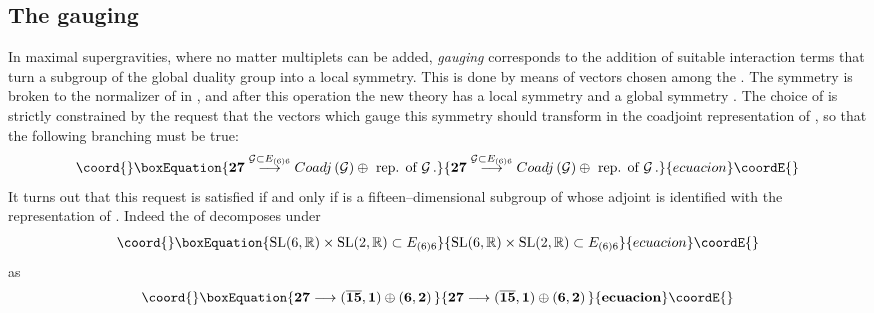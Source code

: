 \documentclass[a4paper,12pt]{article}
\def\bar{\overline}\end {picture}}
\begin{document}
\subsection{The gauging}
In maximal supergravities, where no matter multiplets can be added,
{\it gauging} corresponds to the addition of suitable
interaction terms that turn  a subgroup \coordHE{} of the global
\coordHE{} duality group into a local symmetry.
This is done by means of vectors chosen among the \coordHE{}  \coordHE{}.
The \coordHE{} symmetry is broken to the normalizer of
\coordHE{} in
\coordHE{}, and after this operation
 the new theory has a local symmetry \coordHE{}
and a global symmetry \coordHE{}.
The choice of \coordHE{} is strictly constrained by the request that the vectors which
gauge this symmetry should transform in the coadjoint representation of \coordHE{},
so that the following branching must be true:
\begin{equation}\coord{}\boxEquation{
\label{gaugprop}
{\bf 27}\stackrel{\mathcal{G}\subset E_{\left(6\right)6}}{\longrightarrow}
Coadj\left(\mathcal{G}\right)\oplus\hbox{~rep. of~}\mathcal{G}\,.
}{
{\bf 27}\stackrel{\mathcal{G}\subset E_{\left(6\right)6}}{\longrightarrow}
Coadj\left(\mathcal{G}\right)\oplus\hbox{~rep. of~}\mathcal{G}\,.
}{ecuacion}\coordE{}\end{equation}
It turns out that this request is satisfied if and only if
\coordHE{} is a fifteen--dimensional
subgroup of \coordHE{} whose adjoint
is identified with the \coordHE{} representation of
\coordHE{}. Indeed the \coordHE{} of \coordHE{} decomposes under
\begin{equation}\coord{}\boxEquation{
\mathrm{SL}(6,\mathbb{R})\times \mathrm{SL}(2,\mathbb{R})\subset E_{\left(6\right)6}
}{
\mathrm{SL}(6,\mathbb{R})\times \mathrm{SL}(2,\mathbb{R})\subset E_{\left(6\right)6}
}{ecuacion}\coordE{}\end{equation}
as
\begin{equation}\coord{}\boxEquation{
\bf 27 \longrightarrow ({\bar{15}},1)\oplus (6,2)\,
}{
\bf 27 \longrightarrow ({\bar{15}},1)\oplus (6,2)\,
}{ecuacion}\coordE{}\end{equation}
\end{document}
